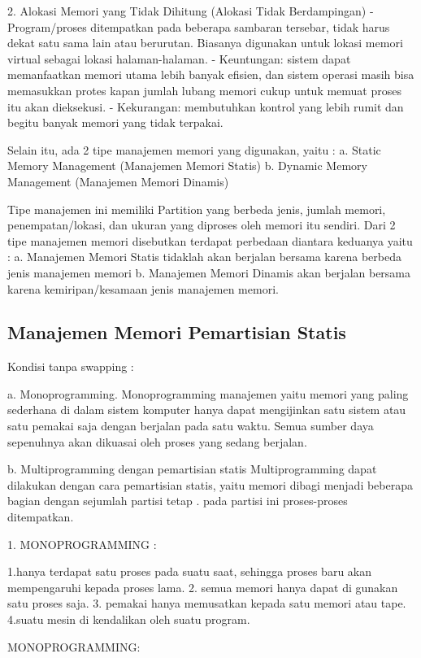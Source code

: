 	2. Alokasi Memori yang Tidak Dihitung (Alokasi Tidak Berdampingan)
		- Program/proses ditempatkan pada beberapa sambaran tersebar, tidak harus dekat satu sama lain atau berurutan. Biasanya digunakan untuk lokasi memori virtual sebagai lokasi halaman-halaman.
		- Keuntungan: sistem dapat memanfaatkan memori utama lebih banyak efisien, dan sistem operasi masih bisa memasukkan protes kapan jumlah lubang memori cukup untuk memuat proses itu akan dieksekusi.
		- Kekurangan: membutuhkan kontrol yang lebih rumit dan begitu banyak memori yang tidak terpakai.

	Selain itu, ada 2 tipe manajemen memori yang digunakan, yaitu :
	a. Static Memory Management (Manajemen Memori Statis)
	b. Dynamic Memory Management (Manajemen Memori Dinamis)

Tipe manajemen ini memiliki Partition yang berbeda jenis, jumlah memori, penempatan/lokasi, dan ukuran yang diproses
oleh memori itu sendiri. Dari 2 tipe manajemen memori disebutkan terdapat perbedaan diantara keduanya yaitu :
a. Manajemen Memori Statis  tidaklah akan berjalan bersama karena berbeda jenis manajemen memori
b. Manajemen Memori Dinamis akan berjalan bersama karena kemiripan/kesamaan jenis manajemen memori.

\subsection {Manajemen Memori Pemartisian Statis}

Kondisi tanpa swapping :

a. Monoprogramming.
Monoprogramming manajemen yaitu memori yang paling sederhana di dalam sistem komputer hanya dapat mengijinkan satu sistem atau satu pemakai saja dengan berjalan pada satu waktu. Semua sumber daya sepenuhnya akan dikuasai oleh proses yang sedang berjalan.

b. Multiprogramming dengan pemartisian statis
Multiprogramming dapat dilakukan dengan cara pemartisian statis, yaitu memori dibagi menjadi beberapa bagian dengan sejumlah partisi tetap . pada partisi ini proses-proses ditempatkan.

1. MONOPROGRAMMING :

	1.hanya terdapat satu proses pada suatu saat, sehingga proses baru akan mempengaruhi kepada proses lama.
	2. semua memori hanya dapat di gunakan satu proses saja.
	3. pemakai hanya memusatkan kepada satu memori atau tape.
	4.suatu mesin di kendalikan oleh suatu program.

		MONOPROGRAMMING:

